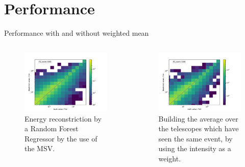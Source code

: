\documentclass[aspectratio=1610, professionalfonts, 9pt]{beamer}
\begin{document}
\section{Performance}
  \begin{frame}{Performance with and without weighted mean}
      \begin{columns}
        \begin{column}{0.5\textwidth}
          \begin{figure}
            \centering
            \includegraphics[width=\textwidth]{Plots/RF_MSV.pdf}
            \caption{Energy reconstriction by a Random Forest Regressor by the use of the MSV.}
          \end{figure}
        \end{column}
        \begin{column}{0.5\textwidth}
          \begin{figure}
            \centering
            \includegraphics[width=\textwidth]{Plots/RF_MSV_wI_mean.pdf}
            \caption{Building the average over the telescopes which have seen the same event, by using the intensity as a weight.}
          \end{figure}
        \end{column}
      \end{columns}
  \end{frame}
\end{document}
